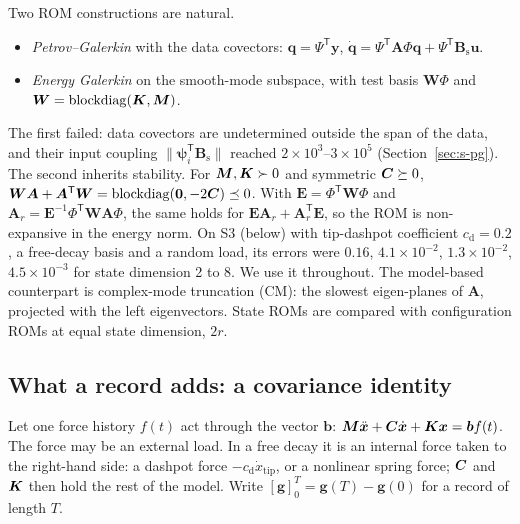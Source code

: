 \documentclass[preprint,12pt]{elsarticle}
\begin{document}
Two ROM constructions are natural.
\begin{itemize}
\item \emph{Petrov--Galerkin} with the data covectors: $\bm{q}=\bm{\varPsi}^{\mathsf T}\bm{y}$, $\dot{\bm{q}}=\bm{\varPsi}^{\mathsf T}\bm{A}\bm{\varPhi}\bm{q}+\bm{\varPsi}^{\mathsf T}\bm{B}_{\mathrm s}\bm{u}$.
\item \emph{Energy Galerkin} on the smooth-mode subspace, with test basis $\bm{W}\bm{\varPhi}$ and $\bm{W}=\operatorname{blockdiag}(\bm{K},\bm{M})$.
\end{itemize}
The first failed: data covectors are undetermined outside the span of the data, and their input coupling $\|\bm{\psi}_i^{\mathsf T}\bm{B}_{\mathrm s}\|$ reached $2\times10^3$--$3\times10^5$ (Section~\ref{sec:s-pg}).
The second inherits stability. For $\bm{M},\bm{K}\succ0$ and symmetric $\bm{C}\succeq0$, $\bm{W}\bm{A}+\bm{A}^{\mathsf T}\bm{W}=\operatorname{blockdiag}(\mathbf 0,-2\bm{C})\preceq0$. With $\bm{E}=\bm{\varPhi}^{\mathsf T}\bm{W}\bm{\varPhi}$ and $\bm{A}_r=\bm{E}^{-1}\bm{\varPhi}^{\mathsf T}\bm{W}\bm{A}\bm{\varPhi}$, the same holds for $\bm{E}\bm{A}_r+\bm{A}_r^{\mathsf T}\bm{E}$, so the ROM is non-expansive in the energy norm. On S3 (below) with tip-dashpot coefficient $c_{\mathrm d}=0.2$, a free-decay basis and a random load, its errors were $0.16$, $4.1\times10^{-2}$, $1.3\times10^{-2}$, $4.5\times10^{-3}$ for state dimension 2 to 8. We use it throughout.
The model-based counterpart is complex-mode truncation (CM): the slowest eigen-planes of $\bm{A}$, projected with the left eigenvectors.
State ROMs are compared with configuration ROMs at equal state dimension, $2r$.

\subsection{What a record adds: a covariance identity}\label{sec:identity}
Let one force history $f(t)$ act through the vector $\bm{b}$: $\bm{M}\ddot{\bm{x}}+\bm{C}\dot{\bm{x}}+\bm{K}\bm{x}=\bm{b}f(t)$. The force may be an external load. In a free decay it is an internal force taken to the right-hand side: a dashpot force $-c_{\mathrm d}\dot x_{\mathrm{tip}}$, or a nonlinear spring force; $\bm{C}$ and $\bm{K}$ then hold the rest of the model. Write $[\bm{g}]_0^T=\bm{g}(T)-\bm{g}(0)$ for a record of length $T$.
\end{document}
